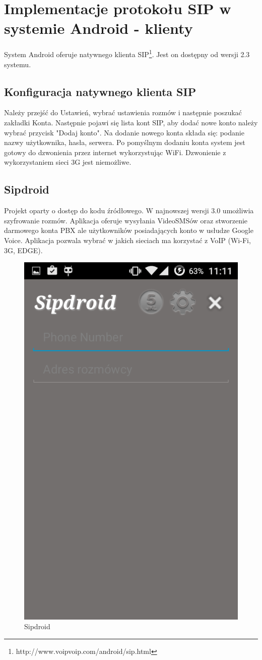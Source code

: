 \section{Implementacje protokołu SIP w systemie Android - klienty}

System Android oferuje natywnego klienta SIP\footnote{http://www.voipvoip.com/android/sip.html}. Jest on  dostępny od wersji 2.3 systemu. 
\subsection{Konfiguracja natywnego klienta SIP}
Należy przejść do Ustawień, wybrać ustawienia rozmów i następnie poszukać zakładki Konta. Następnie pojawi się lista kont SIP, aby dodać nowe konto należy wybrać przycisk "Dodaj konto". Na dodanie nowego konta składa się: podanie nazwy użytkownika, hasła, serwera. Po pomyślnym dodaniu konta system jest gotowy do dzwonienia przez internet wykorzystując WiFi. Dzwonienie z wykorzystaniem sieci 3G jest niemożliwe.


\subsection{Sipdroid}
Projekt oparty o dostęp do kodu źródłowego. W najnowszej wersji 3.0 umożliwia szyfrowanie rozmów. Aplikacja oferuje wysyłania VideoSMSów oraz stworzenie darmowego konta PBX ale użytkowników posiadających konto w usłudze Google Voice. Aplikacja pozwala wybrać w jakich sieciach ma korzystać z VoIP (Wi-Fi, 3G, EDGE).

 
\begin{figure}[H]
\centering
\includegraphics[width=0.4\linewidth]{Screenshot_2015-09-21-11-11-11}
\caption{Sipdroid}
\label{fig:Screenshot_2015-09-21-11-11-11}
\end{figure}



